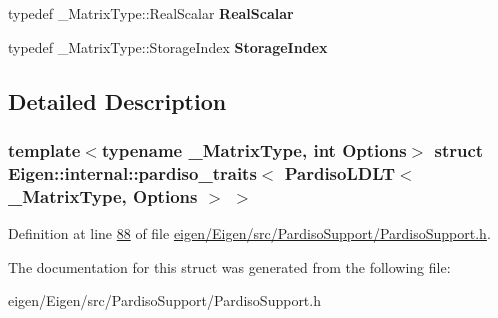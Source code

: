 \begin{DoxyCompactItemize}
\item 
\mbox{\label{struct_eigen_1_1internal_1_1pardiso__traits_3_01_pardiso_l_d_l_t_3_01___matrix_type_00_01_options_01_4_01_4_a35bae36ba68f58b8f2bd3278dfdc2ced}} 
typedef \+\_\+\+Matrix\+Type\+::\+Real\+Scalar {\bfseries Real\+Scalar}
\item 
\mbox{\label{struct_eigen_1_1internal_1_1pardiso__traits_3_01_pardiso_l_d_l_t_3_01___matrix_type_00_01_options_01_4_01_4_ade50d8cb78211b8c04f204e7a50fa524}} 
typedef \+\_\+\+Matrix\+Type\+::\+Storage\+Index {\bfseries Storage\+Index}
\end{DoxyCompactItemize}


\subsection{Detailed Description}
\subsubsection*{template$<$typename \+\_\+\+Matrix\+Type, int Options$>$\newline
struct Eigen\+::internal\+::pardiso\+\_\+traits$<$ Pardiso\+L\+D\+L\+T$<$ \+\_\+\+Matrix\+Type, Options $>$ $>$}



Definition at line \hyperlink{eigen_2_eigen_2src_2_pardiso_support_2_pardiso_support_8h_source_l00088}{88} of file \hyperlink{eigen_2_eigen_2src_2_pardiso_support_2_pardiso_support_8h_source}{eigen/\+Eigen/src/\+Pardiso\+Support/\+Pardiso\+Support.\+h}.



The documentation for this struct was generated from the following file\+:\begin{DoxyCompactItemize}
\item 
eigen/\+Eigen/src/\+Pardiso\+Support/\+Pardiso\+Support.\+h\end{DoxyCompactItemize}
